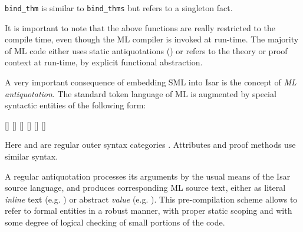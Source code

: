 \begin{isabellebody}
\begin{isamarkuptext}
\begin{description}
  \item \verb|bind_thm| is similar to \verb|bind_thms| but refers to a
  singleton fact.

  \end{description}

  It is important to note that the above functions are really
  restricted to the compile time, even though the ML compiler is
  invoked at run-time.  The majority of ML code either uses static
  antiquotations () or refers to the theory or
  proof context at run-time, by explicit functional abstraction.%
\end{isamarkuptext}%
\isamarkuptrue%
%
\endisatagmlref
{\isafoldmlref}%
%
\isadelimmlref
%
\endisadelimmlref
%
\isamarkuptrue%
%
\begin{isamarkuptext}%
A very important consequence of embedding SML into Isar is the
  concept of \emph{ML antiquotation}.  The standard token language of
  ML is augmented by special syntactic entities of the following form:

  \begin{railoutput}
\rail@bar
{}[]
[]
[]
[]
[]
[]
\rail@endbar
\rail@end
\end{railoutput}


  Here \hyperlink{syntax.nameref}{\mbox{}} and \hyperlink{syntax.args}{\mbox{}} are regular outer syntax
  categories \cite{isabelle-isar-ref}.  Attributes and proof methods
  use similar syntax.

  \medskip A regular antiquotation  processes
  its arguments by the usual means of the Isar source language, and
  produces corresponding ML source text, either as literal
  \emph{inline} text (e.g. ) or abstract
  \emph{value} (e.g. ).  This pre-compilation
  scheme allows to refer to formal entities in a robust manner, with
  proper static scoping and with some degree of logical checking of
  small portions of the code.


\end{isamarkuptext}
\end{isabellebody}
